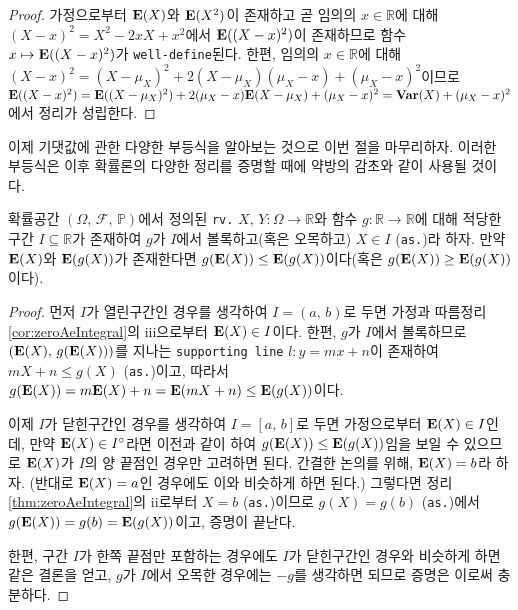 \begin{proof}
    가정으로부터 $\mathbf{E}(X)$와 $\mathbf{E}(X^2)$이 존재하고 곧 임의의 $x\in\mathbb{R}$에 대해 $(X-x)^2=X^2-2xX+x^2$에서 $\mathbf{E}((X-x)^2)$이 존재하므로 함수 $x\mapsto\mathbf{E}((X-x)^2)$가 \texttt{well-define}된다. 한편, 임의의 $x\in\mathbb{R}$에 대해 $(X-x)^2=(X-\mu_X)^2+2(X-\mu_X)(\mu_X-x)+(\mu_X-x)^2$이므로 $\mathbf{E}((X-x)^2)=\mathbf{E}((X-\mu_X)^2)+2(\mu_X-x)\mathbf{E}(X-\mu_X)+(\mu_X-x)^2=\mathbf{Var}(X)+(\mu_X-x)^2$에서 정리가 성립한다.
\end{proof}

이제 기댓값에 관한 다양한 부등식을 알아보는 것으로 이번 절을 마무리하자. 이러한 부등식은 이후 확률론의 다양한 정리를 증명할 때에 약방의 감초와 같이 사용될 것이다.

\begin{theorem}
    확률공간 $(\Omega,\,\mathcal{F},\,\mathbb{P})$에서 정의된 \texttt{rv.} $X,\,Y:\Omega\to\mathbb{R}$와 함수 $g:\mathbb{R}\to\mathbb{R}$에 대해 적당한 구간 $I\subseteq\mathbb{R}$가 존재하여 $g$가 $I$에서 볼록하고(혹은 오목하고) $X\in I$ (\texttt{as.})라 하자. 만약 $\mathbf{E}(X)$와 $\mathbf{E}(g(X))$가 존재한다면 $g(\mathbf{E}(X))\leq\mathbf{E}(g(X))$이다(혹은 $g(\mathbf{E}(X))\geq\mathbf{E}(g(X))$이다).
\end{theorem}

\begin{proof}
    먼저 $I$가 열린구간인 경우를 생각하여 $I=(a,\,b)$로 두면 가정과 따름정리 \ref{cor:zeroAeIntegral}의 iii으로부터 $\mathbf{E}(X)\in I$이다. 한편, $g$가 $I$에서 볼록하므로 $(\mathbf{E}(X),\,g(\mathbf{E}(X)))$를 지나는 \texttt{supporting line} $l:y=mx+n$이 존재하여 $mX+n\leq g(X)$ (\texttt{as.})이고, 따라서 $g(\mathbf{E}(X))=m\mathbf{E}(X)+n=\mathbf{E}(mX+n)\leq\mathbf{E}(g(X))$이다.

    이제 $I$가 닫힌구간인 경우를 생각하여 $I=[a,\,b]$로 두면 가정으로부터 $\mathbf{E}(X)\in I$인데, 만약 $\mathbf{E}(X)\in I^\circ$라면 이전과 같이 하여 $g(\mathbf{E}(X))\leq\mathbf{E}(g(X))$임을 보일 수 있으므로 $\mathbf{E}(X)$가 $I$의 양 끝점인 경우만 고려하면 된다. 간결한 논의를 위해, $\mathbf{E}(X)=b$라 하자. (반대로 $\mathbf{E}(X)=a$인 경우에도 이와 비슷하게 하면 된다.) 그렇다면 정리 \ref{thm:zeroAeIntegral}의 ii로부터 $X=b$ (\texttt{as.})이므로 $g(X)=g(b)$ (\texttt{as.})에서 $g(\mathbf{E}(X))=g(b)=\mathbf{E}(g(X))$이고, 증명이 끝난다.

    한편, 구간 $I$가 한쪽 끝점만 포함하는 경우에도 $I$가 닫힌구간인 경우와 비슷하게 하면 같은 결론을 얻고, $g$가 $I$에서 오목한 경우에는 $-g$를 생각하면 되므로 증명은 이로써 충분하다.
\end{proof}


